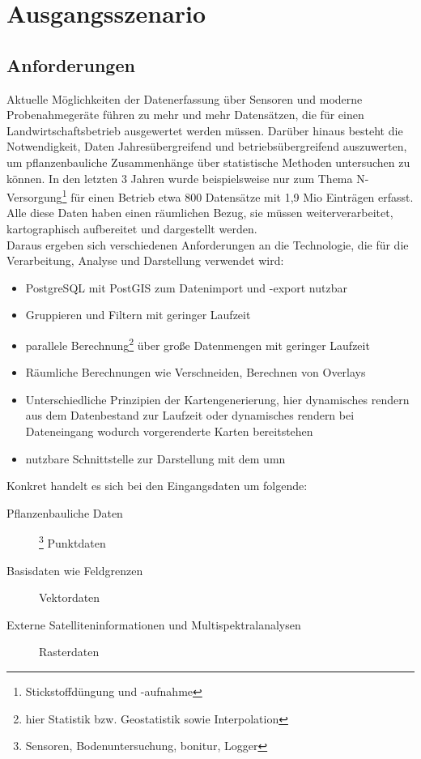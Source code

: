 \chapter{Ausgangsszenario}

\section{Anforderungen}
\label{Anforderungen}

Aktuelle Möglichkeiten der Datenerfassung über Sensoren und moderne Probenahmegeräte führen zu mehr und mehr Datensätzen, die für einen Landwirtschaftsbetrieb ausgewertet werden müssen. Darüber hinaus besteht die Notwendigkeit, Daten Jahresübergreifend und betriebsübergreifend auszuwerten, um pflanzenbauliche Zusammenhänge über statistische Methoden untersuchen zu können.
In den letzten 3 Jahren wurde beispielsweise nur zum Thema N-Versorgung\footnote{Stickstoffdüngung und -aufnahme} für einen Betrieb etwa 800 Datensätze mit 1,9 Mio Einträgen erfasst. Alle diese Daten haben einen räumlichen Bezug, sie müssen weiterverarbeitet, kartographisch aufbereitet und dargestellt werden.\\
Daraus ergeben sich verschiedenen Anforderungen an die Technologie, die für die Verarbeitung, Analyse und Darstellung verwendet wird:
\begin{itemize}
\item PostgreSQL mit PostGIS zum Datenimport und -export nutzbar
\item Gruppieren und Filtern mit geringer Laufzeit
\item parallele Berechnung\footnote{hier Statistik bzw. Geostatistik sowie Interpolation} über große Datenmengen mit geringer Laufzeit
\item Räumliche Berechnungen wie Verschneiden, Berechnen von Overlays
\item  Unterschiedliche Prinzipien der Kartengenerierung, hier dynamisches rendern aus dem Datenbestand zur Laufzeit oder dynamisches rendern bei Dateneingang wodurch vorgerenderte Karten bereitstehen
\item nutzbare Schnittstelle zur Darstellung mit dem \Gls{umn}
\end{itemize}


Konkret handelt es sich bei den Eingangsdaten um folgende:
\begin{description}
\item[Pflanzenbauliche Daten]\footnote{Sensoren, Bodenuntersuchung, \Gls{bonitur}, Logger} Punktdaten
\item[Basisdaten wie Feldgrenzen] Vektordaten
\item[Externe Satelliteninformationen und Multispektralanalysen] Rasterdaten
\end{description}

